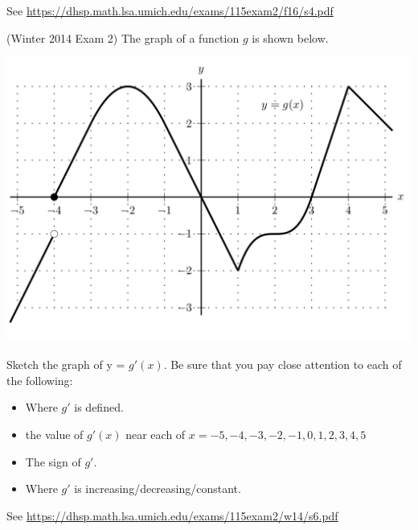 \documentclass[11pt]{exam}
\begin{document}
\begin{questions}
\begin{solution}
 See \href{https://dhsp.math.lsa.umich.edu/exams/115exam2/f16/s4.pdf}{https://dhsp.math.lsa.umich.edu/exams/115exam2/f16/s4.pdf}  
\end{solution}
\vspace{1.5in}
\question (Winter 2014 Exam 2) The graph of a function $g$ is shown below.
  \begin{center}
  \includegraphics[scale=0.4]{graphg.png}
  \end{center}
Sketch the graph of y = $g'(x)$. Be sure that you pay close attention to each of the following:
\begin{itemize}
\item Where $g'$ is defined.
\item the value of $g'(x)$ near each of $x = -5,-4,-3,-2,-1,0,1,2,3,4,5$
\item The sign of $g'$.
\item Where $g'$ is increasing/decreasing/constant.
\end{itemize}
\begin{solution}
  See \href{https://dhsp.math.lsa.umich.edu/exams/115exam2/w14/s6.pdf}{https://dhsp.math.lsa.umich.edu/exams/115exam2/w14/s6.pdf}
\end{solution}
\end{questions}
\end{document}
